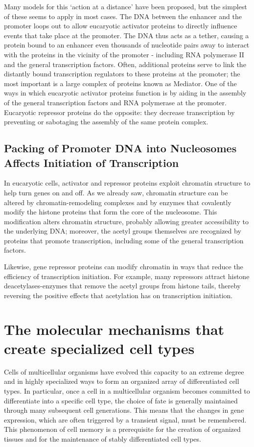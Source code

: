 Many models for this ‘action at a distance’ have been proposed, but
the simplest of these seems to apply in most cases. The DNA between
the enhancer and the promoter loops out to allow eucaryotic activator 
proteins to directly influence events that take place at the promoter. 
The DNA thus acts as a tether, causing a protein bound to
an enhancer even thousands of nucleotide pairs away to interact with
the proteins in the vicinity of the promoter - including RNA polymerase
II and the general transcription factors. Often, additional proteins serve 
to link the distantly bound transcription regulators
to these proteins at the promoter; the most important is a large complex 
of proteins known as Mediator. One of the ways in
which eucaryotic activator proteins function is by aiding in the assembly
of the general transcription factors and RNA polymerase at the promoter.
Eucaryotic repressor proteins do the opposite: they decrease transcription
by preventing or sabotaging the assembly of the same protein complex.

\subsection{Packing of Promoter DNA into Nucleosomes Affects Initiation of Transcription}

In eucaryotic cells, activator and repressor proteins exploit chromatin
structure to help turn genes on and off. As we already saw, chromatin 
structure can be altered by chromatin-remodeling complexes and by
enzymes that covalently modify the histone proteins that form the core
of the nucleosome. This modification alters chromatin structure,
probably allowing greater accessibility to the underlying DNA; moreover,
the acetyl groups themselves are recognized by proteins that promote
transcription, including some of the general transcription factors.

Likewise, gene repressor proteins can modify chromatin in ways that
reduce the efficiency of transcription initiation. For example, many repressors 
attract histone deacetylases-enzymes that remove the acetyl groups
from histone tails, thereby reversing the positive effects that acetylation
has on transcription initiation.

\section{The molecular mechanisms that create specialized cell types}

Cells of multicellular organisms have evolved
this capacity to an extreme degree and in highly specialized ways to form
an organized array of differentiated cell types. In particular, once a cell in a
multicellular organism becomes committed to differentiate into a specific
cell type, the choice of fate is generally maintained through many subsequent 
cell generations. This means that the changes in gene expression,
which are often triggered by a transient signal, must be remembered. This
phenomenon of cell memory is a prerequisite for the creation of organized 
tissues and for the maintenance of stably differentiated cell types.

